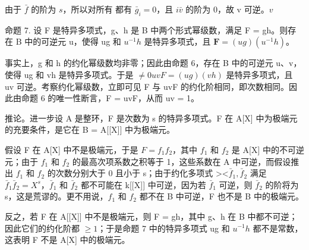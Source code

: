 由于 \(\bar{f}\) 的阶为 \(s\)，所以对所有  都有 \(\bar{g}_i = 0\)，且 \(i\)\(\bar{v}\) 的阶为 0，故 v 可逆。\(v\)

命题 7. 设 F 是特异多项式，g、h 是 B 中两个形式幂级数，满足 F = gh。则存在 B 中的可逆元 u，使得 ug 和 \(u^{-1}h\) 是特异多项式，且 \(\mathbf{F} = (ug)(u^{-1}h)\)。

事实上，g 和 h 的约化幂级数均非零；因此由命题 6，存在 B 中的可逆元 u、v，使得 ug 和 vh 是特异多项式。于是 \(\neq0\)\(uvF = (ug)(vh)\) 是特异多项式，且 uv 可逆。考察约化幂级数，立即可见 F 与 uvF 的约化阶相同，即次数相同。因此由命题 6 的唯一性断言，F = uvF，从而 uv = 1。

推论。进一步设 A 是整环，F 是次数为 s 的特异多项式。F 在 A{[}X{]} 中为极端元的充要条件，是它在 B = A{[}{[}X{]}{]} 中为极端元。

假设 F 在 A{[}X{]} 中不是极端元，于是 \(F = f_{1}f_{2}\)，其中 \(f_{1}\) 和 \(f_{2}\) 是 A{[}X{]} 中的不可逆元；由于 \(f_{1}\) 和 \(f_{2}\) 的最高次项系数之积等于 1，这些系数在 A 中可逆，而假设推出 \(f_{1}\) 和 \(f_{2}\) 的次数分别大于 0 且小于 s；由于约化多项式 \textgreater\textless\(\bar{f}_{1}, \bar{f}_{2}\) 满足 \(\bar{f}_{1}\bar{f}_{2} = X^{s}\)，\(\bar{f}_{1}\) 和 \(\bar{f}_{2}\) 都不可能在 k{[}{[}X{]}{]} 中可逆，因为若 \(\bar{f}_{1}\) 可逆，则 \(\bar{f}_{2}\) 的阶将为 s，这是荒谬的。更不用说，\(f_{1}\) 和 \(f_{2}\) 都不在 B 中可逆，F 也不是 B 中的极端元。

反之，若 F 在 A{[}{[}X{]}{]} 中不是极端元，则 F = gh，其中 g、h 在 B 中都不可逆；因此它们的约化阶都 \(\geqslant 1\)；于是命题 7 中的特异多项式 ug 和 \(u^{-1}h\) 都不是常数，这表明 F 不是 A{[}X{]} 中的极端元。

